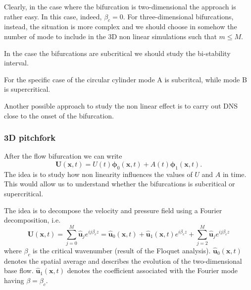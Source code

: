 \documentclass[onecolumn,notitlepage,superscriptaddress, amsmath,amssymb,longbibliographyaps,floatfix]{revtex4-1}
\begin{document}
Clearly, in the case where the bifurcation is two-dimensional the approach is rather easy. In this case, indeed, $\beta_c = 0$. For three-dimensional bifurcations, instead, the situation is more complex and we should choose in somehow the number of mode to include in the 3D non linear simulations such that $m\le M$.

In the case the bifurcations are subcritical we should study the bi-stability interval.


For the specific case of the circular cylinder mode A is subcritcal, while mode B is supercritical.


Another possible approach to study the non linear effect is to carry out DNS close to the onset of the bifurcation.

\subsubsection{3D pitchfork}

After the flow bifurcation we can write
%
\begin{equation}
  \bm{U}(\bm{x},t) = U(t) \bm{\phi}_0(\bm{x},t) + A(t) \bm{\phi}_1(\bm{x},t).
\end{equation}
%
The idea is to study how non linearity influences the values of $U$ and $A$ in time. This would allow us to understand whether the bifurcations is subcritical or supercritical.

The idea is to decompose the velocity and pressure field using a Fourier decomposition, i.e.
%
\begin{equation}
  \bm{U}(\bm{x},t) = \sum_{j=0}^M \hat{\bm{u}}_j e^{i j \beta_c z} = \hat{\bm{u}}_0(\bm{x},t) + \hat{\bm{u}}_1(\bm{x},t) e^{i \beta_c z}+
                     \sum_{j=2}^M \hat{\bm{u}}_j e^{i j \beta_c z} 
\end{equation}
%
where $\beta_c$ is the critical wavenumber (result of the Floquet analysis). $\hat{\bm{u}}_0(\bm{x},t)$ denotes the spatial average and describes the evolution of the two-dimensional base flow. $\hat{\bm{u}}_1(\bm{x},t)$ denotes the coefficient associated with the Fourier mode having $\beta = \beta_c$.
\end{document}
